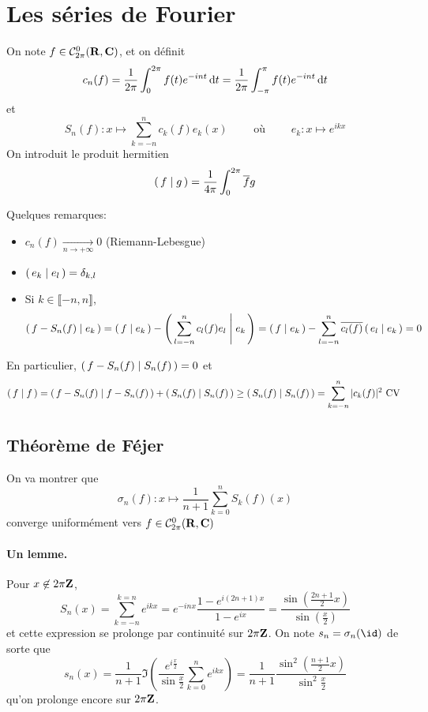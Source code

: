 \section{Les séries de Fourier}

On note $f \in  \mathcal  C^0_{2\pi}(\mathbf R, \mathbf C)$, et on définit \[
    c_n(f)= \frac{1}{2\pi}\int_0^{2\pi} f(t)e^{-int}\mathop{}\!\mathrm d t=\frac{1}{2\pi}\int_{-\pi}^\pi f(t)e^{-int}\mathop{}\!\mathrm d t
\] 
et \[
    S_n(f):x \longmapsto \sum_{k=-n}^{n} c_k(f)e_k(x) \qquad  \text{ où } \qquad e_k:x \longmapsto e^{ikx}
\] 
On introduit le produit hermitien \[
    \pscalar{f}{g}=\frac{1}{4\pi} \int_0^{2\pi} \bar{f}g
\] 

Quelques remarques: \begin{itemize}
    \item $c_n(f)\xrightarrow[n \to  +\infty]{}0$ (Riemann-Lebesgue)
    \item  $ \pscalar{e_k}{e_l}=\delta_{k,l} $
    \item Si $k \in  \llbracket -n, n \rrbracket $, \[
            \pscalar{f-S_n(f)}{e_k} = \pscalar{f}{e_k} - \pscalar{\sum_{l=-n}^{n} c_l(f)e_l}{e_k}= \pscalar f{e_k}-\sum_{l=-n}^n \bar{c_l(f)} \pscalar{e_l}{e_k} =0
    \] 
\end{itemize}
En particulier, $\pscalar{f-S_n(f)}{S_n(f)} =0$ et \[
    \pscalar{f}{f} =\pscalar{f-S_n(f)}{f-S_n(f)} + \pscalar{S_n(f)}{S_n(f)} \geq \pscalar{S_n(f)}{S_n(f)} = \sum_{k=-n}^{n} |c_k(f)|^2 \text{ CV }
\] 

\subsection{Théorème de Féjer}

On va montrer que \[
    \sigma_n(f):x \longmapsto \frac{1}{n+1}\sum_{k=0}^nS_k(f)(x)
\] 
converge uniformément vers $f \in  \mathcal  C^0_{2\pi}(\mathbf R, \mathbf C)$

\paragraph{Un lemme.}
Pour $x \not \in  2\pi\mathbf Z$, \[
    S_n(x)= \sum_{k=-n}^{k=n} e^{ikx}=e^{-inx} \frac{1-e^{i(2n+1)x}}{1-e^{ix}}= \frac{\sin\left( \frac{2n+1}{2}x \right) }{\sin\left( \frac{x}{2} \right) }
\] 
et cette expression se prolonge par continuité sur $2\pi\mathbf Z$. On note $s_n=\sigma_n(\id)$ de sorte que \[
    s_n(x)=\frac{1}{n+1}\Im\left( \frac{e^{i\frac{x}{2}}}{\sin \frac{x}{2}}  \sum_{k=0}^{n} e^{ikx}\right) =\frac{1}{n+1} \frac{\sin^2 (\frac{n+1}{2}x)}{\sin^2 \frac{x}{2}}
\] 
qu'on prolonge encore sur $2\pi\mathbf Z$.

